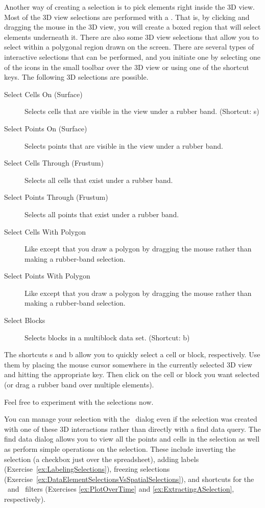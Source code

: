 Another way of creating a selection is to pick elements right
inside the 3D view.  Most of the 3D view selections are performed with a
.  That is, by clicking and dragging the
mouse in the 3D view, you will create a boxed region that will select
elements underneath it.  There are also some 3D view selections that allow
you to select within a polygonal region drawn on the screen.  There are
several types of interactive selections that can be performed, and you
initiate one by selecting one of the icons in the small toolbar over the 3D
view or using one of the shortcut keys.  The following 3D selections are
possible.

\begin{description}
\item[\selectCellsOn Select Cells On (Surface)] Selects cells that are
  visible in the view under a rubber band.  (Shortcut: s)
\item[\selectPointsOn Select Points On (Surface)] Selects points that are
  visible in the view under a rubber band.
\item[\selectCellsThrough Select Cells Through (Frustum)] Selects all cells
  that exist under a rubber band.
\item[\selectPointsThrough Select Points Through (Frustum)] Selects all
  points that exist under a rubber band.
\item[\selectCellsPolygon Select Cells With Polygon] Like  except that you draw a polygon by dragging the mouse rather than
  making a rubber-band selection.
\item[\selectPointsPolygon Select Points With Polygon] Like  except that you draw a polygon by dragging the mouse rather
  than making a rubber-band selection.
\item[\selectBlocks Select Blocks] Selects blocks in a
  multiblock data set.  (Shortcut: b)
\end{description}

The shortcuts s and b allow you to quickly select a cell or block,
respectively.  Use them by placing the mouse cursor somewhere in the
currently selected 3D view and hitting the appropriate key.  Then click on
the cell or block you want selected (or drag a rubber band over multiple
elements).

Feel free to experiment with the selections now.

You can manage your selection with the ~\findData dialog
even if the selection was created with one of these 3D interactions rather
than directly with a find data query. The find data dialog allows you to
view all the points and cells in the selection as well as perform simple
operations on the selection. These include inverting the selection (a
checkbox just over the spreadsheet), adding labels
(Exercise~\ref{ex:LabelingSelections}), freezing selections
(Exercise~\ref{ex:DataElementSelectionsVsSpatialSelections}), and shortcuts
for the ~\plotSelectionOverTime and
~\extractSelection filters (Exercises
\ref{ex:PlotOverTime} and \ref{ex:ExtractingASelection}, respectively).

